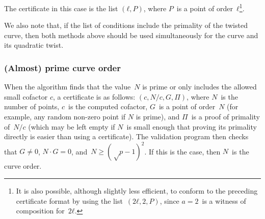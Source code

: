 \documentclass[twocolumn,letterpaper,10pt]{article}
\begin{document}
The certificate in this case is the list $(ℓ, P)$,
where $P$~is a point of order~$ℓ$\footnote{%
It is also possible, although slightly less efficient,
to conform to the preceding certificate format
by using the list~$(2 ℓ, 2, P)$,
since $a = 2$~is a witness of composition for~$2ℓ$.}.

We also note that, if the list of conditions
include the primality of the twisted curve,
then both methods above should be used
simultaneously for the curve and its quadratic twist.
% 
% 
% 

\subsubsection{(Almost) prime curve order}

When the algorithm finds that the value~$N$ is prime
or only includes the allowed small cofactor $c$,
a certificate is as follows: $(c, N/c, G, Π)$,
where $N$~is the number of points, $c$~is the computed cofactor,
$G$~is a point of order~$N$
(for example, any random non-zero point if $N$ is prime),
and $Π$~is a proof of primality of~$N/c$
(which may be left empty if $N$~is small enough
that proving its primality directly is easier than using a certificate).
The validation program then checks that $G ≠ 0$,
$N · G = 0$, and~$N ≥ (√p-1)^2$.
If this is the case, then $N$~is the curve order.
\end{document}

